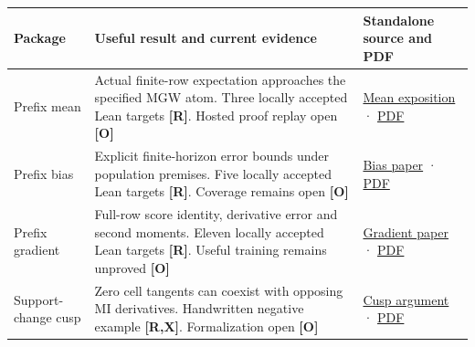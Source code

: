\documentclass[
  11pt,
  a4paper,
]{article}
\newcounter{none} %
\begin{document}
{\def\LTcaptype{none} %
\begin{longtable}[]{@{}
  >{\raggedright\arraybackslash}p{}
  >{\raggedright\arraybackslash}p{}
  >{\raggedright\arraybackslash}p{}@{}}
\toprule\noalign{}
\begin{minipage}[b]{\linewidth}\raggedright
Package
\end{minipage} & \begin{minipage}[b]{\linewidth}\raggedright
Useful result and current evidence
\end{minipage} & \begin{minipage}[b]{\linewidth}\raggedright
Standalone source and PDF
\end{minipage} \\
\midrule\noalign{}
\endhead
\bottomrule\noalign{}
\endlastfoot
Prefix mean & Actual finite-row expectation approaches the specified MGW
atom. Three locally accepted Lean targets \textbf{{[}R{]}}. Hosted proof
replay open \textbf{{[}O{]}} &
\href{https://github.com/sepahead/pid-rs/blob/main/audit/formal/lean-prefix-mgw-mean/EXPOSITION.current.md}{Mean
exposition} ·
\href{https://github.com/sepahead/pid-rs/blob/main/output/pdf/prefix-mgw-mean.pdf}{PDF} \\
Prefix bias & Explicit finite-horizon error bounds under population
premises. Five locally accepted Lean targets \textbf{{[}R{]}}. Coverage
remains open \textbf{{[}O{]}} &
\href{https://github.com/sepahead/pid-rs/blob/main/audit/formal/lean-prefix-mgw-bias/EXPOSITION.md}{Bias
paper} ·
\href{https://github.com/sepahead/pid-rs/blob/main/output/pdf/prefix-mgw-bias.pdf}{PDF} \\
Prefix gradient & Full-row score identity, derivative error and second
moments. Eleven locally accepted Lean targets \textbf{{[}R{]}}. Useful
training remains unproved \textbf{{[}O{]}} &
\href{https://github.com/sepahead/pid-rs/blob/main/audit/research/finite-prefix-mgw-gradient/EXPOSITION.md}{Gradient
paper} ·
\href{https://github.com/sepahead/pid-rs/blob/main/output/pdf/finite-prefix-mgw-gradient.pdf}{PDF} \\
Support-change cusp & Zero cell tangents can coexist with opposing MI
derivatives. Handwritten negative example \textbf{{[}R,X{]}}.
Formalization open \textbf{{[}O{]}} &
\href{https://github.com/sepahead/pid-rs/blob/main/audit/research/support-change-mi-cusp/EXPOSITION.md}{Cusp
argument} ·
\href{https://github.com/sepahead/pid-rs/blob/main/output/pdf/support-change-mi-cusp.pdf}{PDF} \\

\end{longtable}}
\end{document}
